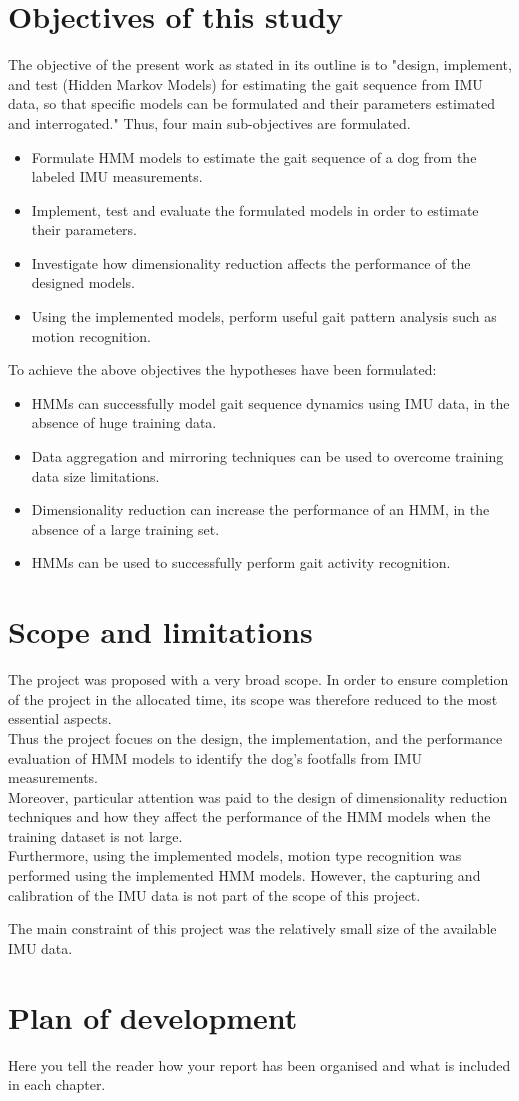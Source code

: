 \section{Objectives of this study}
The objective of the present work as stated in its outline is to "design, implement, and test (Hidden Markov Models) for estimating the gait sequence
from IMU data, so that specific models can be formulated and their
parameters estimated and interrogated." Thus, four main sub-objectives are formulated.
\begin{itemize}
	\item Formulate HMM models to estimate the gait sequence of a dog from the labeled IMU measurements.
	\item Implement, test and evaluate the formulated models in order to estimate their parameters.
	\item Investigate how dimensionality reduction affects the performance of the designed models.
	\item Using the implemented models, perform useful gait pattern analysis such as motion recognition.
\end{itemize}

To achieve the above objectives the hypotheses have been formulated:
\begin{itemize}
	\item HMMs can successfully model gait sequence dynamics using IMU data, in the absence of huge training data.
	\item Data aggregation and mirroring techniques can be used to overcome training data size limitations.
	\item Dimensionality reduction can increase the performance of an HMM, in the absence of a large training set.
	\item HMMs can be used to successfully perform gait activity recognition.
\end{itemize}


\section{Scope and limitations}
The project was proposed with a very broad scope. In order to ensure completion of the project in the allocated time, its scope was therefore reduced to the most essential aspects.\\
Thus the project focues on the design, the implementation, and the performance evaluation of HMM models to identify the dog's footfalls from IMU measurements.\\
Moreover, particular attention was paid to the design of dimensionality reduction techniques and how they affect the performance of the HMM models when the training dataset is not large.\\
Furthermore, using the implemented models, motion type recognition was performed using the implemented HMM models. However, the capturing and calibration of the IMU data is not part of the scope of this project.

The main constraint of this project was the relatively small size of the available IMU data.
\section{Plan of development}
Here you tell the reader how your report has been organised and what is included in each
chapter.
